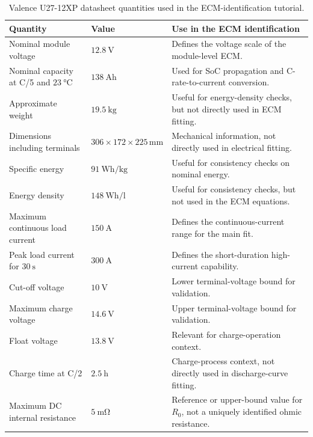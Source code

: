 \documentclass[a4paper,12pt]{article}
\begin{document}
\begin{table}[H]
\centering
\caption{Valence U27-12XP datasheet quantities used in the ECM-identification tutorial.}
\label{tab:valence_u27_data}
\begin{tabularx}{0.98\textwidth}{@{}L{0.34\textwidth}C{0.22\textwidth}Y@{}}
\toprule
\textbf{Quantity} &
\textbf{Value} &
\textbf{Use in the ECM identification} \\
\midrule
Nominal module voltage &
\(\SI{12.8}{\volt}\) &
Defines the voltage scale of the module-level ECM. \\
Nominal capacity at C/5 and \(\SI{23}{\celsius}\) &
\(\SI{138}{\ampere\hour}\) &
Used for SoC propagation and C-rate-to-current conversion. \\
Approximate weight &
\(\SI{19.5}{\kilogram}\) &
Useful for energy-density checks, but not directly used in ECM fitting. \\
Dimensions including terminals &
\(306\times172\times225\,\si{\milli\metre}\) &
Mechanical information, not directly used in electrical fitting. \\
Specific energy &
\(\SI{91}{\watt\hour\per\kilogram}\) &
Useful for consistency checks on nominal energy. \\
Energy density &
\(\SI{148}{\watt\hour\per\litre}\) &
Useful for consistency checks, but not used in the ECM equations. \\
Maximum continuous load current &
\(\SI{150}{\ampere}\) &
Defines the continuous-current range for the main fit. \\
Peak load current for \(\SI{30}{\second}\) &
\(\SI{300}{\ampere}\) &
Defines the short-duration high-current capability. \\
Cut-off voltage &
\(\SI{10}{\volt}\) &
Lower terminal-voltage bound for validation. \\
Maximum charge voltage &
\(\SI{14.6}{\volt}\) &
Upper terminal-voltage bound for validation. \\
Float voltage &
\(\SI{13.8}{\volt}\) &
Relevant for charge-operation context. \\
Charge time at C/2 &
\(\SI{2.5}{\hour}\) &
Charge-process context, not directly used in discharge-curve fitting. \\
Maximum DC internal resistance &
\(\SI{5}{\milli\ohm}\) &
Reference or upper-bound value for \(R_0\), not a uniquely identified ohmic resistance. \\
\bottomrule
\end{tabularx}
\end{table}
\end{document}
